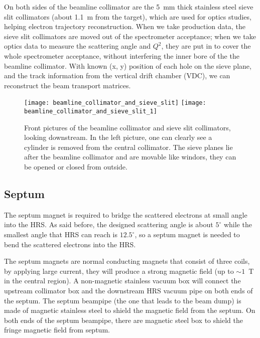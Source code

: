 On both sides of the beamline collimator are the 5~mm thick stainless steel
sieve slit collimators (about 1.1~m from the target), which    %
are used for optics studies, helping electron trajectory reconstruction. When
we take production data, the sieve slit collimators are moved out of the spectrometer
acceptance; when we take optics data to measure the scattering angle and $Q^2$,
they are put in to cover the whole spectrometer acceptance,
without interfering the inner bore of the the beamline collimator. With known
(x, y) position of each hole on the sieve plane, and the track information from 
the vertical drift chamber (VDC), we can reconstruct the beam transport matrices.
\begin{figure}[!h]
    \centering
    \texttt{[image: beamline\_collimator\_and\_sieve\_slit]}
    \hspace{1cm}
    \texttt{[image: beamline\_collimator\_and\_sieve\_slit\_1]}
    \caption[sieve slit collimators]
    {Front pictures of the beamline collimator and sieve slit collimators, looking 
    downstream. In the left picture, one can clearly see a cylinder is removed 
    from the central collimator.
    The sieve planes lie after the beamline collimator and are movable like
    windors, they can be opened or closed from outside.}
\end{figure}

\subsection{Septum}
The septum magnet is required to bridge the scattered electrons at small angle
into the HRS. As said before, the designed scattering angle is about $5^\circ$
while the smallest angle that HRS can reach is $12.5^\circ$, so a septum magnet 
is needed to bend the scattered electrons into the HRS. 

The septum magnets are normal conducting magnets that consist of three coils, 
by applying large current, they will produce a
strong magnetic field (up to $\sim 1$~T in the central region). A non-magnetic
stainless vacuum box will connect the upstream collimator box and the downstream 
HRS vacuum pipe on both ends of the septum. The septum beampipe (the one that
leads to the beam dump) is made of magnetic stainless steel to shield the
magnetic field from the septum. On both ends of the septum beampipe, there
are magnetic steel box to shield the fringe magnetic field from septum. 

